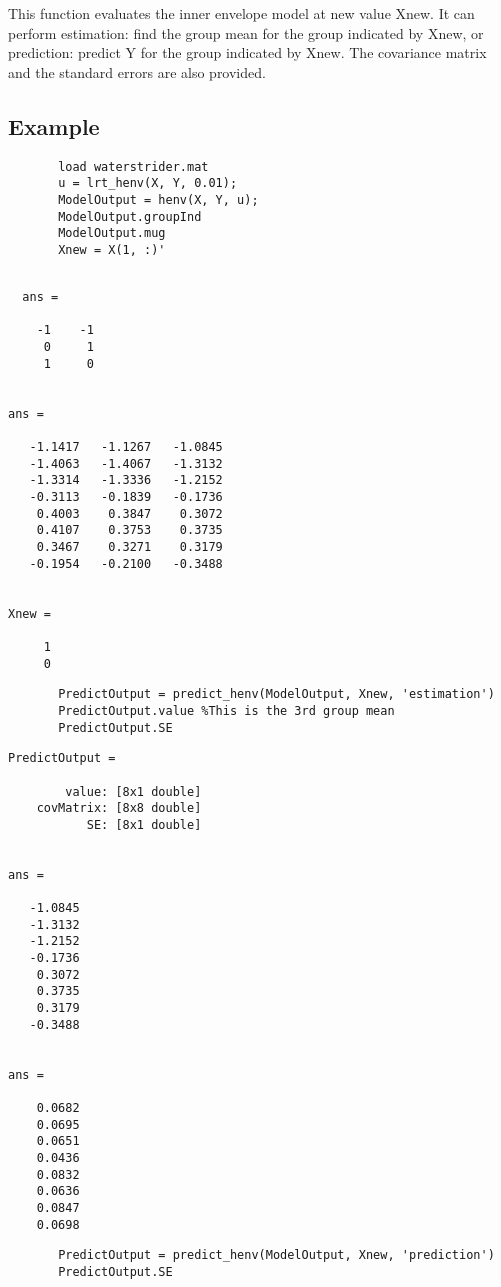 \documentclass[a4paper,11pt,openany]{memoir}
\begin{document}
\begin{par}
This function evaluates the inner envelope model at new value Xnew.  It can perform estimation: find the group mean for the group indicated by Xnew, or prediction: predict Y for the group indicated by Xnew.  The covariance matrix and the standard errors are also provided.
\end{par} \vspace{1em}


\subsection*{Example}


\begin{verbatim}       load waterstrider.mat
       u = lrt_henv(X, Y, 0.01);
       ModelOutput = henv(X, Y, u);
       ModelOutput.groupInd
       ModelOutput.mug
       Xnew = X(1, :)'
       \end{verbatim}
        \color{lightgray}\ttfamily \begin{verbatim}
  
  ans =

    -1    -1
     0     1
     1     0


ans =

   -1.1417   -1.1267   -1.0845
   -1.4063   -1.4067   -1.3132
   -1.3314   -1.3336   -1.2152
   -0.3113   -0.1839   -0.1736
    0.4003    0.3847    0.3072
    0.4107    0.3753    0.3735
    0.3467    0.3271    0.3179
   -0.1954   -0.2100   -0.3488


Xnew =

     1
     0
\end{verbatim} \rmfamily
\color{black}
          
       \begin{verbatim}
       PredictOutput = predict_henv(ModelOutput, Xnew, 'estimation')
       PredictOutput.value %This is the 3rd group mean
       PredictOutput.SE
\end{verbatim}
    
        \color{lightgray}\ttfamily \begin{verbatim}
PredictOutput = 

        value: [8x1 double]
    covMatrix: [8x8 double]
           SE: [8x1 double]


ans =

   -1.0845
   -1.3132
   -1.2152
   -0.1736
    0.3072
    0.3735
    0.3179
   -0.3488


ans =

    0.0682
    0.0695
    0.0651
    0.0436
    0.0832
    0.0636
    0.0847
    0.0698
\end{verbatim} \rmfamily
\color{black}
       \begin{verbatim}
       PredictOutput = predict_henv(ModelOutput, Xnew, 'prediction')
       PredictOutput.SE\end{verbatim}
\end{document}
